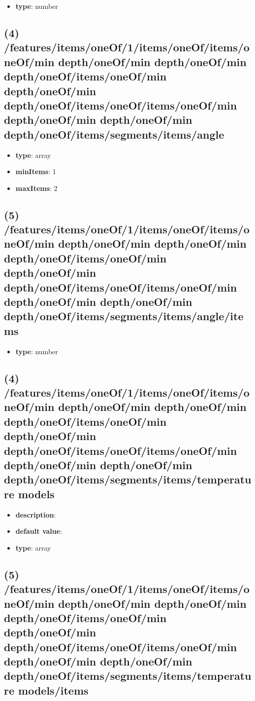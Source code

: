 \begin{itemize}[leftmargin=5em]\item {\bf type}: number
\end{itemize}\subsection{(4) /features/items/oneOf/1/items/oneOf/items/oneOf/min depth/oneOf/min depth/oneOf/min depth/oneOf/items/oneOf/min depth/oneOf/min depth/oneOf/items/oneOf/items/oneOf/min depth/oneOf/min depth/oneOf/min depth/oneOf/items/segments/items/angle}
\begin{itemize}[leftmargin=4em]\item {\bf type}: array
\item {\bf minItems}: 1
\item {\bf maxItems}: 2
\end{itemize}\subsection{(5) /features/items/oneOf/1/items/oneOf/items/oneOf/min depth/oneOf/min depth/oneOf/min depth/oneOf/items/oneOf/min depth/oneOf/min depth/oneOf/items/oneOf/items/oneOf/min depth/oneOf/min depth/oneOf/min depth/oneOf/items/segments/items/angle/items}
\begin{itemize}[leftmargin=5em]\item {\bf type}: number
\end{itemize}\subsection{(4) /features/items/oneOf/1/items/oneOf/items/oneOf/min depth/oneOf/min depth/oneOf/min depth/oneOf/items/oneOf/min depth/oneOf/min depth/oneOf/items/oneOf/items/oneOf/min depth/oneOf/min depth/oneOf/min depth/oneOf/items/segments/items/temperature models}
\begin{itemize}[leftmargin=4em]\item {\bf description}: 
\item {\bf default value}: 
\item {\bf type}: array
\end{itemize}\subsection{(5) /features/items/oneOf/1/items/oneOf/items/oneOf/min depth/oneOf/min depth/oneOf/min depth/oneOf/items/oneOf/min depth/oneOf/min depth/oneOf/items/oneOf/items/oneOf/min depth/oneOf/min depth/oneOf/min depth/oneOf/items/segments/items/temperature models/items}


